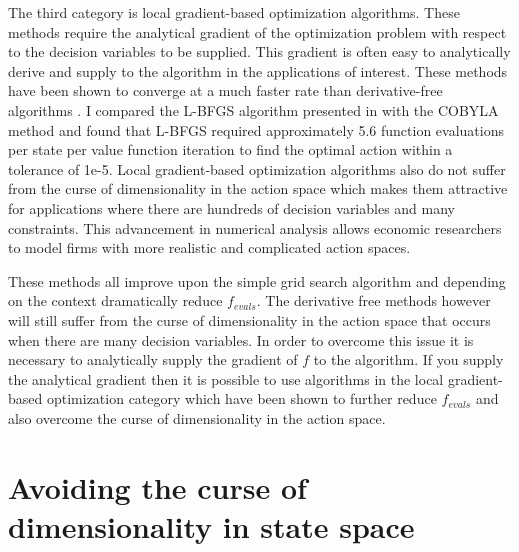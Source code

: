 \documentclass[12pt]{article}
\begin{document}
The third category is local gradient-based optimization algorithms. These methods require the analytical gradient of the optimization problem with respect to the decision variables to be supplied. This gradient is often easy to analytically derive and supply to the algorithm in the applications of interest. These methods have been shown to converge at a much faster rate than derivative-free algorithms \citep{friendly}. I compared the L-BFGS algorithm presented in \cite{bfgs1, bfgs2} with the COBYLA method and found that L-BFGS required approximately 5.6 function evaluations per state per value function iteration to find the optimal action within a tolerance of 1e-5. Local gradient-based optimization algorithms also do not suffer from the curse of dimensionality in the action space which makes them attractive for applications where there are hundreds of decision variables and many constraints. This advancement in numerical analysis allows economic researchers to model firms with  more realistic and complicated action spaces.

These methods all improve upon the simple grid search algorithm and depending on the context dramatically reduce $f_{evals}$. The derivative free methods however will still suffer from the curse of dimensionality in the action space that occurs when there are many decision variables. In order to overcome this issue it is necessary to analytically supply the gradient of $f$ to the algorithm. If you supply the analytical gradient then it is possible to use algorithms in the local gradient-based optimization category which have been shown to further reduce $f_{evals}$ and also overcome the curse of dimensionality in the action space.

\section{Avoiding the curse of dimensionality in state space}
\label{state}
\end{document}
